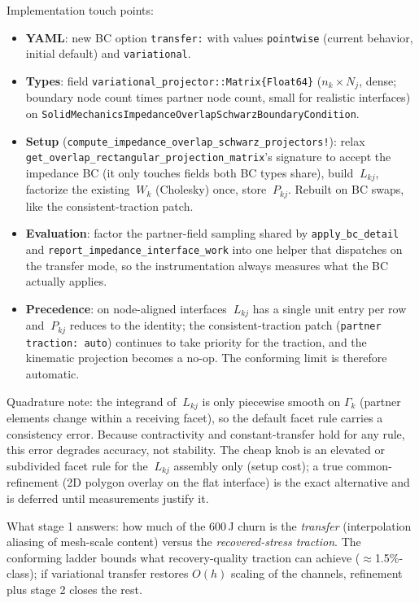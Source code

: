 \documentclass[11pt]{article}
\begin{document}
Implementation touch points:
\begin{itemize}
\item \textbf{YAML}: new BC option \texttt{transfer:} with values
      \texttt{pointwise} (current behavior, initial default) and
      \texttt{variational}.
\item \textbf{Types}: field \texttt{variational\_projector::Matrix\{Float64\}}
      ($n_k \times N_j$, dense; boundary node count times partner node
      count, small for realistic interfaces) on
      \texttt{SolidMechanicsImpedanceOverlapSchwarzBoundaryCondition}.
\item \textbf{Setup} (\texttt{compute\_impedance\_overlap\_schwarz\_projectors!}):
      relax \texttt{get\_overlap\_rectangular\_projection\_matrix}'s
      signature to accept the impedance BC (it only touches fields both
      BC types share), build $~L_{kj}$, factorize the existing
      $~W_k$ (Cholesky) once, store $~P_{kj}$.  Rebuilt on BC swaps,
      like the consistent-traction patch.
\item \textbf{Evaluation}: factor the partner-field sampling shared by
      \texttt{apply\_bc\_detail} and
      \texttt{report\_impedance\_interface\_work} into one helper that
      dispatches on the transfer mode, so the instrumentation always
      measures what the BC actually applies.
\item \textbf{Precedence}: on node-aligned interfaces $~L_{kj}$ has a
      single unit entry per row and $~P_{kj}$ reduces to the identity;
      the consistent-traction patch (\texttt{partner traction: auto})
      continues to take priority for the traction, and the kinematic
      projection becomes a no-op.  The conforming limit is therefore
      automatic.
\end{itemize}

Quadrature note: the integrand of $~L_{kj}$ is only piecewise smooth
on $\Gamma_k$ (partner elements change within a receiving facet), so
the default facet rule carries a consistency error.  Because
contractivity and constant-transfer hold for any rule, this error
degrades accuracy, not stability.  The cheap knob is an elevated or
subdivided facet rule for the $~L_{kj}$ assembly only (setup cost);
a true common-refinement (2D polygon overlay on the flat interface)
is the exact alternative and is deferred until measurements justify
it.

What stage 1 answers: how much of the 600\,J churn is the
\emph{transfer} (interpolation aliasing of mesh-scale content) versus
the \emph{recovered-stress traction}.  The conforming ladder bounds
what recovery-quality traction can achieve ($\approx$1.5\%-class); if
variational transfer restores $O(h)$ scaling of the channels, refinement
plus stage 2 closes the rest.
\end{document}

